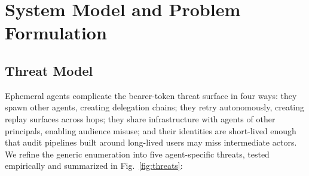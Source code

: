 \documentclass[conference]{IEEEtran}
\begin{document}
\section{System Model and Problem Formulation}
\label{sec:model}

\subsection{Threat Model}
\label{subsec:threats}

Ephemeral agents complicate the bearer-token threat surface in four ways: they spawn other agents, creating delegation chains; they retry autonomously, creating replay surfaces across hops; they share infrastructure with agents of other principals, enabling audience misuse; and their identities are short-lived enough that audit pipelines built around long-lived users may miss intermediate actors. We refine the generic enumeration into five agent-specific threats, tested empirically and summarized in Fig.~\ref{fig:threats}:
\end{document}
